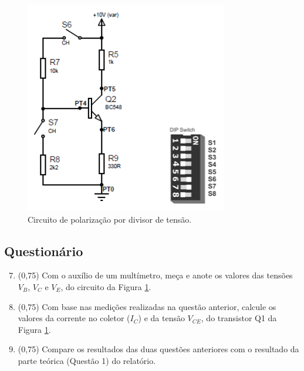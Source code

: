 \documentclass[11pt]{article}
\begin{document}
\begin{figure}[!htb]
\centering
\includegraphics[width=.4\textwidth]{DivisorTensao.png}
\caption{Circuito de polarização por divisor de tensão.}
\label{circ3}
\end{figure}

\subsection*{Questionário}

\begin{enumerate}
\setcounter{enumi}{6}

\item (0,75) Com o auxílio de um multímetro, meça e anote os valores das tensões $V_B$, $V_C$ e $V_E$, do circuito da Figura \ref{circ3}.

\item (0,75) Com base nas medições realizadas na questão anterior, calcule os valores da corrente no coletor ($I_C$) e da tensão $V_{CE}$, do transistor Q1 da Figura \ref{circ3}.

\item (0,75) Compare os resultados das duas questões anteriores com o resultado da parte teórica (Questão 1) do relatório.

\end{enumerate}
\end{document}
